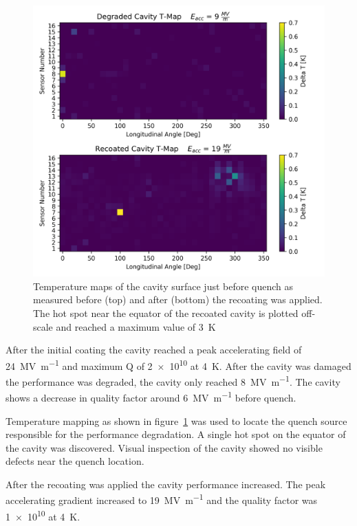\documentclass{revtex4-2}
\begin{document}
\begin{figure}[h]%
    \centering%
    \includegraphics{./figures/TMAP.png}%
    \caption{Temperature maps of the cavity surface just before quench as measured before (top) and after (bottom) the recoating was applied. The hot spot near the equator of the recoated cavity is plotted off-scale and reached a maximum value of \qty{3}{\kelvin}}%
    \label{fig:TMAP}%
\end{figure}

After the initial coating the cavity reached a peak accelerating field of \qty{24}{\mega\volt\per\meter} and maximum Q of \num{2e10} at \qty{4}{\kelvin}. After the cavity was damaged the performance was degraded, the cavity only reached \qty{8}{\mega\volt\per\meter}. The cavity shows a decrease in quality factor around \qty{6}{\mega\volt\per\meter} before quench.

Temperature mapping as shown in figure~\ref{fig:TMAP} was used to locate the quench source responsible for the performance degradation. A single hot spot on the equator of the cavity was discovered. Visual inspection of the cavity showed no visible defects near the quench location.

After the recoating was applied the cavity performance increased. The peak accelerating gradient increased to \qty{19}{\mega\volt\per\meter} and the quality factor was \num{1e10} at \qty{4}{\kelvin}.
\end{document}
